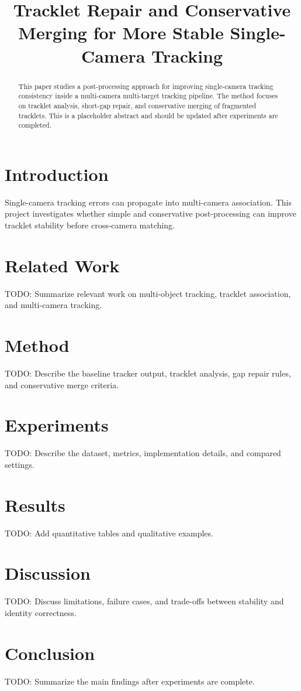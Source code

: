 \documentclass[conference]{IEEEtran}
\title{Tracklet Repair and Conservative Merging for More Stable Single-Camera Tracking}
\author{
    \IEEEauthorblockN{Author Name}
    \IEEEauthorblockA{
        Deep Learning Lab\\
        University Name\\
        Email Address
    }
}
\begin{document}
\maketitle

\begin{abstract}
This paper studies a post-processing approach for improving single-camera
tracking consistency inside a multi-camera multi-target tracking pipeline. The
method focuses on tracklet analysis, short-gap repair, and conservative merging
of fragmented tracklets. This is a placeholder abstract and should be updated
after experiments are completed.
\end{abstract}

\section{Introduction}

Single-camera tracking errors can propagate into multi-camera association. This
project investigates whether simple and conservative post-processing can improve
tracklet stability before cross-camera matching.

\section{Related Work}

TODO: Summarize relevant work on multi-object tracking, tracklet association,
and multi-camera tracking.

\section{Method}

TODO: Describe the baseline tracker output, tracklet analysis, gap repair rules,
and conservative merge criteria.

\section{Experiments}

TODO: Describe the dataset, metrics, implementation details, and compared
settings.

\section{Results}

TODO: Add quantitative tables and qualitative examples.

\section{Discussion}

TODO: Discuss limitations, failure cases, and trade-offs between stability and
identity correctness.

\section{Conclusion}

TODO: Summarize the main findings after experiments are complete.



\end{document}
